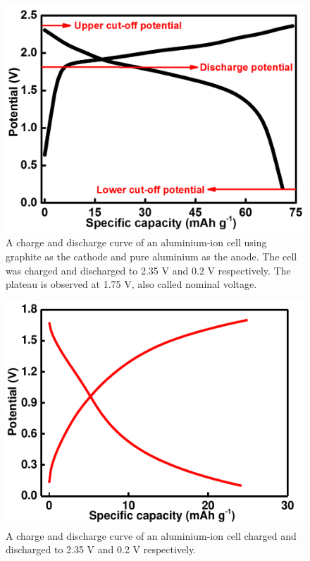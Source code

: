 \begin{itemize}
\begin{figure}[h!]
\centering
\includegraphics[width=\textwidth]{Figures/chap1fig/CDCforcellvoltage}
\caption{A charge and discharge curve of an aluminium-ion cell using graphite as the cathode and pure aluminium as the anode. The cell was charged and discharged to 2.35 V and 0.2 V respectively. The plateau is observed at 1.75 V, also called nominal voltage.}
\label{Figures/chap1fig:CDCforcellvoltage}
\end{figure}

\begin{figure}[tbh!]
\centering
\includegraphics[width=\textwidth]{Figures/chap1fig/batpot.pdf}
\caption{A charge and discharge curve of an aluminium-ion cell charged and discharged to 2.35 V and 0.2 V respectively.}
\label{Figures/chap1fig:batpot}
\end{figure}


\end{itemize}
